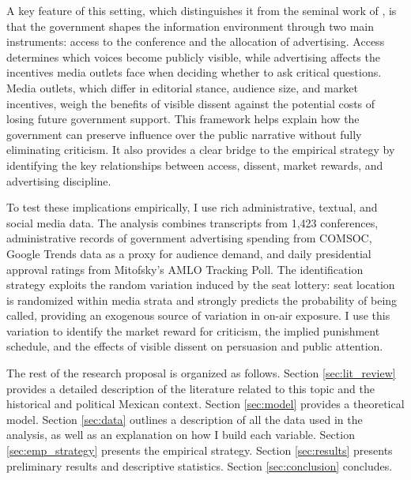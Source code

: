 A key feature of this setting, which distinguishes it from the seminal work of \citep{PersuasionEmpirical-Dellavigna-AR}, is that the government shapes the information environment through two main instruments: access to the conference and the allocation of advertising. Access determines which voices become publicly visible, while advertising affects the incentives media outlets face when deciding whether to ask critical questions. Media outlets, which differ in editorial stance, audience size, and market incentives, weigh the benefits of visible dissent against the potential costs of losing future government support. This framework helps explain how the government can preserve influence over the public narrative without fully eliminating criticism. It also provides a clear bridge to the empirical strategy by identifying the key relationships between access, dissent, market rewards, and advertising discipline.

To test these implications empirically, I use rich administrative, textual, and social media data. The analysis combines transcripts from 1,423 conferences, administrative records of government advertising spending from COMSOC, Google Trends data as a proxy for audience demand, and daily presidential approval ratings from Mitofsky's AMLO Tracking Poll. The identification strategy exploits the random variation induced by the seat lottery: seat location is randomized within media strata and strongly predicts the probability of being called, providing an exogenous source of variation in on-air exposure. I use this variation to identify the market reward for criticism, the implied punishment schedule, and the effects of visible dissent on persuasion and public attention.

The rest of the research proposal is organized as follows. Section \ref{sec:lit_review} provides a detailed description of the literature related to this topic and the historical and political Mexican context. Section \ref{sec:model} provides a theoretical model. Section \ref{sec:data} outlines a description of all the data used in the analysis, as well as an explanation on how I build each variable. Section \ref{sec:emp_strategy} presents the empirical strategy. Section \ref{sec:results} presents preliminary results and descriptive statistics. Section \ref{sec:conclusion} concludes.
